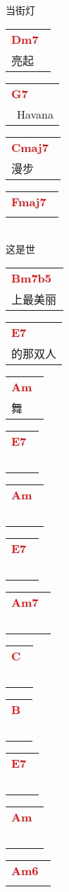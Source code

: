 \documentclass[12pt,a4paper,openany,UTF8]{memoir}
\begin{document}
当街灯\begin{tabular}[b]{l}
    \textbf{\textcolor{red}{Dm7\ }}\\亮起\mbox{}\end{tabular}\begin{tabular}[b]{l}
    \textbf{\textcolor{red}{G7\ }}\\~Havana\mbox{}\end{tabular}\begin{tabular}[b]{l}
    \textbf{\textcolor{red}{Cmaj7\ }}\\漫步\mbox{}\end{tabular}\begin{tabular}[b]{l}
    \textbf{\textcolor{red}{Fmaj7\ }}\\\mbox{}\end{tabular}\\
这是世\begin{tabular}[b]{l}
    \textbf{\textcolor{red}{Bm7b5\ }}\\上最美丽\mbox{}\end{tabular}\begin{tabular}[b]{l}
    \textbf{\textcolor{red}{E7\ }}\\的那双人\mbox{}\end{tabular}\begin{tabular}[b]{l}
    \textbf{\textcolor{red}{Am\ }}\\舞~\mbox{}\end{tabular}\begin{tabular}[b]{l}
    \textbf{\textcolor{red}{E7\ }}\\~\mbox{}\end{tabular}\begin{tabular}[b]{l}
    \textbf{\textcolor{red}{Am\ }}\\~\mbox{}\end{tabular}\begin{tabular}[b]{l}
    \textbf{\textcolor{red}{E7\ }}\\~\mbox{}\end{tabular}\begin{tabular}[b]{l}
    \textbf{\textcolor{red}{Am7\ }}\\~\mbox{}\end{tabular}\begin{tabular}[b]{l}
    \textbf{\textcolor{red}{C\ }}\\~\mbox{}\end{tabular}\begin{tabular}[b]{l}
    \textbf{\textcolor{red}{B\ }}\\~\mbox{}\end{tabular}\begin{tabular}[b]{l}
    \textbf{\textcolor{red}{E7\ }}\\~\mbox{}\end{tabular}\begin{tabular}[b]{l}
    \textbf{\textcolor{red}{Am\ }}\\~\mbox{}\end{tabular}\begin{tabular}[b]{l}
    \textbf{\textcolor{red}{Am6\ }}\\\mbox{}\end{tabular}
\end{document}
